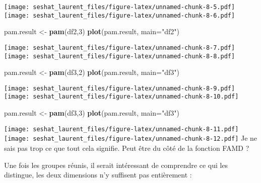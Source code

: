\documentclass[
]{article}
\newenvironment{Shaded}{\begin{snugshade}}{\end{snugshade}}
\newcommand{\CommentTok}[1]{\textcolor[rgb]{0.56,0.35,0.01}{\textit{#1}}}
\newcommand{\DataTypeTok}[1]{\textcolor[rgb]{0.13,0.29,0.53}{#1}}
\newcommand{\DecValTok}[1]{\textcolor[rgb]{0.00,0.00,0.81}{#1}}
\newcommand{\KeywordTok}[1]{\textcolor[rgb]{0.13,0.29,0.53}{\textbf{#1}}}
\newcommand{\NormalTok}[1]{#1}
\newcommand{\OperatorTok}[1]{\textcolor[rgb]{0.81,0.36,0.00}{\textbf{#1}}}
\newcommand{\StringTok}[1]{\textcolor[rgb]{0.31,0.60,0.02}{#1}}
\begin{document}
\texttt{[image: seshat\_laurent\_files/figure-latex/unnamed-chunk-8-5.pdf]}
\texttt{[image: seshat\_laurent\_files/figure-latex/unnamed-chunk-8-6.pdf]}

\begin{Shaded}
\begin{Highlighting}[]
\NormalTok{pam.result <-}\StringTok{ }\KeywordTok{pam}\NormalTok{(df2,}\DecValTok{3}\NormalTok{)}
\KeywordTok{plot}\NormalTok{(pam.result, }\DataTypeTok{main=}\StringTok{"df2"}\NormalTok{)}
\end{Highlighting}
\end{Shaded}

\texttt{[image: seshat\_laurent\_files/figure-latex/unnamed-chunk-8-7.pdf]}
\texttt{[image: seshat\_laurent\_files/figure-latex/unnamed-chunk-8-8.pdf]}

\begin{Shaded}
\begin{Highlighting}[]
\NormalTok{pam.result <-}\StringTok{ }\KeywordTok{pam}\NormalTok{(df3,}\DecValTok{2}\NormalTok{)}
\KeywordTok{plot}\NormalTok{(pam.result, }\DataTypeTok{main=}\StringTok{"df3"}\NormalTok{)}
\end{Highlighting}
\end{Shaded}

\texttt{[image: seshat\_laurent\_files/figure-latex/unnamed-chunk-8-9.pdf]}
\texttt{[image: seshat\_laurent\_files/figure-latex/unnamed-chunk-8-10.pdf]}

\begin{Shaded}
\begin{Highlighting}[]
\NormalTok{pam.result <-}\StringTok{ }\KeywordTok{pam}\NormalTok{(df3,}\DecValTok{3}\NormalTok{)}
\KeywordTok{plot}\NormalTok{(pam.result, }\DataTypeTok{main=}\StringTok{"df3"}\NormalTok{)}
\end{Highlighting}
\end{Shaded}

\texttt{[image: seshat\_laurent\_files/figure-latex/unnamed-chunk-8-11.pdf]}
\texttt{[image: seshat\_laurent\_files/figure-latex/unnamed-chunk-8-12.pdf]}
Je ne sais pas trop ce que tout cela signifie. Peut être du côté de la
fonction FAMD ?

Une fois les groupes réunis, il serait intéressant de comprendre ce qui
les distingue, les deux dimensions n'y suffisent pas entièrement :

\begin{Shaded}
\end{Shaded}
\end{document}
